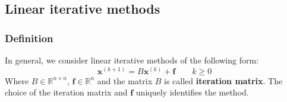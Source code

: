 \subsection{Linear iterative methods}

\subsubsection{Definition}

In general, we consider linear iterative methods of the following form:
\begin{equation*}
    \mathbf{x}^{\left(k+1\right)} = B\mathbf{x}^{\left(k\right)} + \mathbf{f} \hspace{2em} k \ge 0
\end{equation*}
Where $B \in \mathbb{R}^{n \times n}$, $\mathbf{f} \in \mathbb{R}^{n}$ and the matrix $B$ is called \textbf{iteration matrix}. The choice of the iteration matrix and $\mathbf{f}$ uniquely identifies the method.

